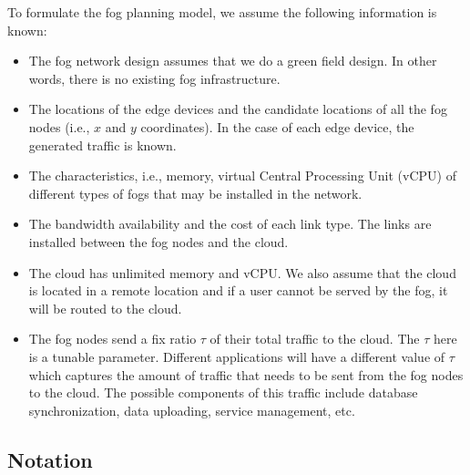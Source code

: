 \documentclass[10pt,journal,compsoc]{IEEEtran}
\begin{document}
To formulate the fog planning model, we assume the following information is known:  
\begin{itemize}
\item The fog network design assumes that we do a green field design. In other words, there is no existing fog infrastructure.
\item The locations of the edge devices and the candidate locations of all the fog nodes (i.e., $x$ and $y$ coordinates). In the case of each edge device, the generated traffic is known.
\item The characteristics, i.e., memory, virtual Central Processing Unit (vCPU) of different types of fogs that may be installed in the network.
\item The bandwidth availability and the cost of each link type. The links are installed between the fog nodes and the cloud.
\item The cloud has unlimited memory and vCPU. We also assume that the cloud is located in a remote location and if a user cannot be served by the fog, it will be routed to the cloud.
\item The fog nodes send a fix ratio $\tau$ of their total traffic to the cloud. The $\tau$ here is a tunable parameter. Different applications will have a different value of $\tau$ which captures the amount of traffic that needs to be sent from the fog nodes to the cloud. The possible components of this traffic include database synchronization, data uploading, service management, etc.
\end{itemize}






\subsection{Notation}
\end{document}
